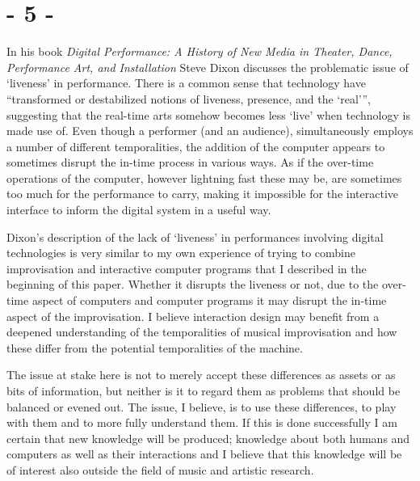 \documentclass{article}
\begin{document}



\section*{- 5 -}
\label{sec:-5-}

In his book \emph{Digital Performance: A History of New Media in Theater, Dance, Performance Art, and Installation} Steve Dixon discusses the problematic issue of `liveness' in performance. There is a common sense that technology have ``transformed or destabilized notions of liveness, presence, and the `real''', \citep[127]{dixon07} suggesting that the real-time arts somehow becomes less `live' when technology is made use of. 
Even though a performer (and an audience), simultaneously employs a number of different temporalities, the addition of the computer appears to sometimes disrupt the in-time process in various ways. As if the over-time operations of the computer, however lightning fast these may be, are sometimes too much for the performance to carry, making it impossible for the interactive interface to inform the digital system in a useful way. 

Dixon's description of the lack of `liveness' in performances involving digital technologies is very similar to my own experience of trying to combine improvisation and interactive computer programs that I described in the beginning of this paper. 
Whether it disrupts the liveness or not, due to the over-time aspect of computers and computer programs it may disrupt the in-time aspect of the improvisation. 
I believe interaction design may benefit from a deepened understanding of the temporalities of musical improvisation and how these differ from the potential temporalities of the machine. 

The issue at stake here is not to merely accept these differences as assets or as bits of information, but neither is it to regard them as problems that should be balanced or evened out. The issue, I believe, is to use these differences, to play with them and to more fully understand them. If this is done successfully I am certain that new knowledge will be produced; knowledge about both humans and computers as well as their interactions and I believe that this knowledge will be of interest also outside the field of music and artistic research.
\end{document}
